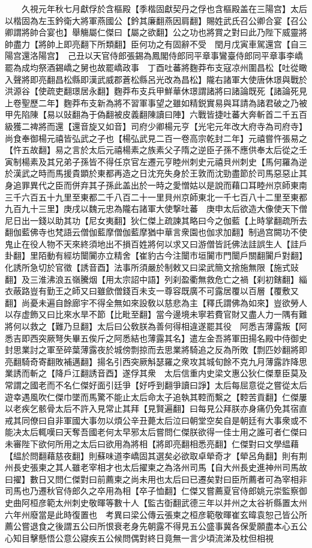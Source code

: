 　　久視元年秋七月獻俘於含樞殿【季楷固獻契丹之俘也含樞殿盖在三陽宫】太后以楷固為左玉鈐衛大將軍燕國公【鈐其廉翻燕因肩翻】賜姓武氏召公卿合宴【召公卿謂將帥合宴也】舉觴屬仁傑曰【屬之欲翻】公之功也將賞之對曰此乃陛下威靈將帥盡力【將帥上即亮翻下所類翻】臣何功之有固辭不受　閏月戊寅車駕還宫【自三陽宫還洛陽宫】　己丑以天官侍郎張錫為鳳閣侍郎同平章事鸞臺侍郎同平章事李嶠罷為成均祭酒錫嶠之舅也故罷嶠政事　丁酉吐蕃將麴莽布支寇凉州圍昌松【吐從瞰入聲將即亮翻昌松縣即漢武威郡蒼松縣呂光改為昌松】隴右諸軍大使唐休璟與戰於洪源谷【使疏吏翻璟居永翻】麴莽布支兵甲鮮華休璟謂諸將曰諸論既死【諸論死見上卷聖歷二年】麴莽布支新為將不習軍事望之雖如精鋭實易與耳請為諸君破之乃被甲先陷陳【易以䜴翻為于偽翻被皮義翻陳讀曰陣】六戰皆捷吐蕃大奔斬首二千五百級獲二禆將而還【還音旋又如音】司府少卿楊元亨【光宅元年改大府寺為司府寺】尚食奉御楊元禧皆弘武之子也【楊弘武見二百一卷高宗乾封二年】元禧嘗忤張易之【忤五故翻】易之言於太后元禧楊素之族素父子隋之逆臣子孫不應供奉太后從之壬寅制楊素及其兄弟子孫皆不得任京官左遷元亨睦州刺史元禧貝州刺史【馬何羅為逆於漢武之時而馬援貴顕於東都再造之日沈充失身於王敦而沈勁盡節於司馬惡惡止其身追罪異代之臣而併弃其子孫此盖出於一時之愛憎姑以是說而藉口耳睦州京師東南三千六百五十九里至東都二千八百二十一里貝州京師東北一千七百八十二里至東都九百九十三里】庚戌以魏元忠為隴右諸軍大使撃吐蕃　庚申太后欲造大像使天下僧尼日出一錢以助其功【尼女夷翻】狄仁傑上疏諫其略曰今之伽藍【上時掌翻疏所去翻伽藍佛寺也梵語云僧伽藍摩僧伽藍摩猶中華言衆園也伽求加翻】制過宫闕功不使鬼止在役人物不天來終須地出不損百姓將何以求又曰游僧皆託佛法詿誤生人【詿戶卦翻】里陌動有經坊闤闠亦立精舍【崔豹古今注闤市垣闠市門闤戶關翻闠戶對翻】化誘所急切於官徵【誘音酉】法事所須嚴於制敕又曰梁武簡文捨施無限【施式䜴翻】及三淮沸浪五嶺騰烟【用太宗詔中語】列刹盈衢無救危亡之禍【刹初鎋翻】緇衣蔽路豈有勤王之師又曰雖歛僧錢百未支一尊容既廣不可露居覆以百層【覆敷又翻】尚憂未遍自餘廊宇不得全無如來設敎以慈悲為主【釋氏謂佛為如來】豈欲勞人以存虚飾又曰比來水旱不節【比毗至翻】當今邊境未寧若費官財又盡人力一隅有難將何以救之【難乃旦翻】太后曰公敎朕為善何得相違遂罷其役　阿悉吉薄露叛【阿悉吉即西突厥弩失畢五俟斤之阿悉結也薄露其名】遣左金吾將軍田揚名殿中侍御史封思業討之軍至碎葉薄露夜於城傍剽掠而去思業將騎追之反為所敗【剽匹妙翻將即亮翻騎奇寄翻敗補邁翻】揚名引西突厥斛瑟羅之衆攻其城旬餘不克九月薄露詐降思業誘而斬之【降戶江翻誘音酉】遂俘其衆　太后信重内史梁文惠公狄仁傑羣臣莫及常謂之國老而不名仁傑好面引廷爭【好呼到翻爭讀曰諍】太后每屈意從之嘗從太后遊幸遇風吹仁傑巾墜而馬驚不能止太后命太子追執其鞚而繫之【鞚苦貢翻】仁傑屢以老疾乞骸骨太后不許入見常止其拜【見賢遍翻】曰每見公拜朕亦身痛仍免其宿直戒其同僚曰自非軍國大事勿以煩公辛丑薨太后泣曰朝堂空矣自是朝廷有大事衆或不能决太后輒嘆曰天奪吾國老何太早邪太后嘗問仁傑朕欲得一佳士用之誰可者仁傑曰未審陛下欲何所用之太后曰欲用為將相【將即亮翻相悉亮翻】仁傑對曰文學緼藉【緼於問翻藉慈夜翻】則蘇味道李嶠固其選矣必欲取卓犖奇才【犖呂角翻】則有荆州長史張柬之其人雖老宰相才也太后擢柬之為洛州司馬【自大州長史進神州司馬故曰擢】數日又問仁傑對曰前薦柬之尚未用也太后曰已遷矣對曰臣所薦者可為宰相非司馬也乃遷秋官侍郎久之卒用為相【卒子恤翻】仁傑又嘗薦夏官侍郎姚元崇監察御史曲阿桓彦範太州刺史敬暉等數十人【監古衘翻武德三年以并州之太谷祈縣置太州六年州廢當是此時復置也　考異曰梁公傳云張柬之桓彦範敬暉崔玄暐袁恕己皆公所薦公嘗退食之後謂五公曰所恨衰老身先朝露不得見五公盛事冀各保愛願盡本心五公心知目擊懸悟公意公寢疾五公候問偶對終日竟無一言少頃流涕及枕但相視